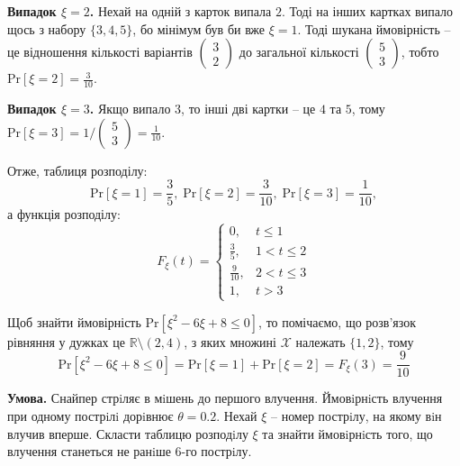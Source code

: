 \documentclass[oneside,solution]{karazin-prob-theory-assign}
\begin{document}
\textbf{Випадок $\xi=2$.} Нехай на одній з карток випала $2$. Тоді на інших картках випало щось з набору $\{3,4,5\}$, бо мінімум був би вже $\xi=1$. Тоді шукана ймовірність -- це відношення кількості варіантів $\begin{pmatrix}
    3 \\ 2
\end{pmatrix}$ до загальної кількості $\begin{pmatrix}
    5 \\ 3
\end{pmatrix}$, тобто $\text{Pr}[\xi=2]=\frac{3}{10}$.

\textbf{Випадок $\xi=3$.} Якщо випало $3$, то інші дві картки -- це $4$ та $5$, тому $\text{Pr}[\xi=3]=1/\begin{pmatrix}
    5 \\ 3
\end{pmatrix} = \frac{1}{10}$.  

Отже, таблиця розподілу:
\begin{equation}
    \text{Pr}[\xi=1] = \frac{3}{5}, \; \text{Pr}[\xi=2] = \frac{3}{10}, \; \text{Pr}[\xi=3] = \frac{1}{10},
\end{equation}
а функція розподілу:
\begin{equation}
    F_{\xi}(t) = \begin{cases}
        0, & t \leq 1 \\
        \frac{3}{5}, & 1 < t \leq 2 \\
        \frac{9}{10}, & 2 < t \leq 3 \\
        1, & t > 3
    \end{cases}
\end{equation}

Щоб знайти ймовірність $\text{Pr}[\xi^2-6\xi+8 \leq 0]$, то помічаємо, що розв'язок рівняння у дужках це $\mathbb{R}\setminus (2,4)$, з яких множині $\mathcal{X}$ належать $\{1,2\}$, тому
\begin{equation}
    \text{Pr}[\xi^2-6\xi+8 \leq 0] = \text{Pr}[\xi=1] + \text{Pr}[\xi=2] = F_{\xi}(3) = \frac{9}{10}
\end{equation}


\hspace{20px}\textbf{Умова.} Снайпер стрiляє в мiшень до першого влучення. Ймовiрнiсть влучення при одному пострiлi дорiвнює $\theta=0.2$. Нехай $\xi$ -- номер пострiлу, на якому
вiн влучив вперше. Скласти таблицю розподiлу $\xi$ та знайти
ймовiрнiсть того, що влучення станеться не ранiше 6-го пострiлу.
\end{document}
